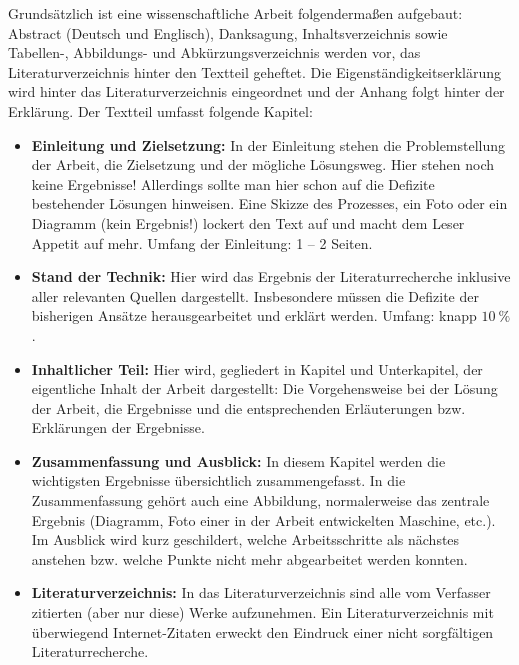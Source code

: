 \documentclass[utf8, a4paper, 11pt, parskip, pointlessnumbers]{scrreprt}
\begin{document}
Grundsätzlich ist eine wissenschaftliche Arbeit folgendermaßen aufgebaut: Abstract (Deutsch und Englisch), Danksagung, Inhaltsverzeichnis sowie Tabellen-, Abbildungs- und Abkürzungsverzeichnis werden vor, das Literaturverzeichnis hinter den Textteil geheftet. Die Eigenständigkeitserklärung wird hinter das Literaturverzeichnis eingeordnet und der Anhang folgt hinter der Erklärung. Der Textteil umfasst folgende Kapitel:

\begin{itemize}
\item{\textbf{Einleitung und Zielsetzung:}}
In der Einleitung stehen die Problemstellung der Arbeit, die Zielsetzung und der mögliche Lösungsweg. Hier stehen noch keine Ergebnisse! Allerdings sollte man hier schon auf die Defizite bestehender Lösungen hinweisen. Eine Skizze des Prozesses, ein Foto oder ein Diagramm (kein Ergebnis!) lockert den Text auf und macht dem Leser Appetit auf mehr. Umfang der Einleitung: 1 – 2 Seiten.

\item{\textbf{Stand der Technik:}}
Hier wird das Ergebnis der Literaturrecherche inklusive aller relevanten Quellen dargestellt. Insbesondere müssen die Defizite der bisherigen Ansätze herausgearbeitet und erklärt werden. Umfang: knapp $10~\si{\percent}$.

\item{\textbf{Inhaltlicher Teil:}}
Hier wird, gegliedert in Kapitel und Unterkapitel, der eigentliche Inhalt der Arbeit dargestellt: Die Vorgehensweise bei der Lösung der Arbeit, die Ergebnisse und die entsprechenden Erläuterungen bzw. Erklärungen der Ergebnisse. 

\item{\textbf{Zusammenfassung und Ausblick:} }
In diesem Kapitel werden die wichtigsten Ergebnisse übersichtlich zusammengefasst. In die Zusammenfassung gehört auch eine Abbildung, normalerweise das zentrale Ergebnis (Diagramm, Foto einer in der Arbeit entwickelten Maschine, etc.). Im Ausblick wird kurz geschildert, welche Arbeitsschritte als nächstes anstehen bzw. welche Punkte nicht mehr abgearbeitet werden konnten.

\item{\textbf{Literaturverzeichnis:}}
In das Literaturverzeichnis sind alle vom Verfasser zitierten (aber nur diese) Werke aufzunehmen. Ein Literaturverzeichnis mit überwiegend Internet-Zitaten erweckt den Eindruck einer nicht sorgfältigen Literaturrecherche.
\end{itemize}
\end{document}
